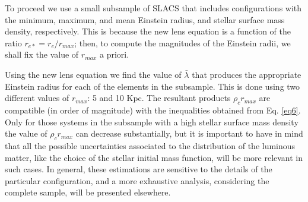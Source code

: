 \documentclass[10pt,a4paper]{article}
\begin{document}
\begin{multicols}{2}
To proceed we use a small subsample of SLACS that includes configurations with the minimum, maximum, and mean Einstein radius, and stellar surface mass density, respectively. This is because the new lens equation is a function of the ratio $r_{e\ast} = r_{e}/r_{max}$; then, to compute the magnitudes of the Einstein radii, we shall fix the value of $r_{max}$ a priori.\

Using the new lens equation we find the value of $\bar{\lambda}$ that produces the appropriate Einstein radius for each of the elements in the subsample. This is done using two different values of $r_{max}$: 5 and 10 Kpc. The resultant products $\rho_c r_{max}$ are compatible (in order of magnitude) with the inequalities obtained from Eq. \eqref{eq6}. Only for those systems in the subsample with a high stellar surface mass density the value of $\rho_c r_{max}$ can decrease substantially, but it is important to have in mind that all the possible
uncertainties associated to the distribution of the luminous matter, like the choice of the stellar initial mass function, will be more relevant in such cases. In general, these estimations are sensitive to the details of the particular configuration, and a more exhaustive analysis, considering the complete sample, will be presented elsewhere.



\end{multicols}
\end{document}
